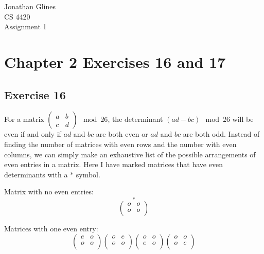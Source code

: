 \documentclass[12pt]{article}
\begin{document}
\begin{flushright}
{\Large
Jonathan Glines \\
CS 4420 \\
Assignment 1 \\
}
\end{flushright}
\section*{Chapter 2 Exercises 16 and 17}
\subsection*{Exercise 16}
For a matrix $\left(\begin{matrix} a & b \\ c & d\end{matrix}\right) \mod 26$, the determinant $\left(ad - bc\right) \mod 26$ will be even if and only if $ad$ and $bc$ are both even or $ad$ and $bc$ are both odd. Instead of finding the number of matrices with even rows and the number with even columns, we can simply make an exhaustive list of the possible arrangements of even entries in a matrix. Here I have marked matrices that have even determinants with a $*$ symbol.

Matrix with no even entries:
\[
\stackrel{*}
{
\left(\begin{matrix}
o & o \\
o & o \\
\end{matrix}\right)
}
\]

Matrices with one even entry:
\[
\left(\begin{matrix}
e & o \\
o & o \\
\end{matrix}\right)
\left(\begin{matrix}
o & e \\
o & o \\
\end{matrix}\right)
\left(\begin{matrix}
o & o \\
e & o \\
\end{matrix}\right)
\left(\begin{matrix}
o & o \\
o & e \\
\end{matrix}\right)
\]
\end{document}
